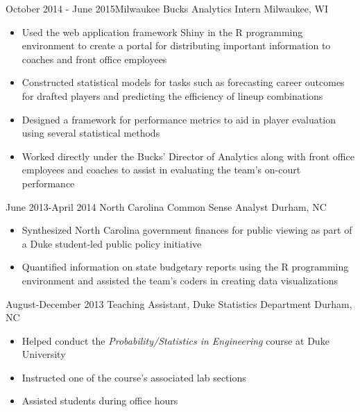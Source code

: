 \documentclass[10pt,a4paper,sans]{moderncv}        %
\begin{document}
\cventry
  {October 2014 - June 2015}{Milwaukee Bucks Analytics Intern}
  {}
  {Milwaukee, WI}
  {}
  {
    \begin{itemize}
      \item{Used the web application framework Shiny in the R programming environment to create a portal for distributing important 
      information to coaches and front office employees}
      \item{Constructed statistical models for tasks such as forecasting career outcomes for drafted players and predicting the 
      efficiency of lineup combinations}
      \item{Designed a framework for performance metrics to aid in player evaluation using several statistical methods}
      \item{Worked directly under the Bucks' Director of Analytics along with front office employees and coaches to assist in evaluating 
      the team's on-court performance}
    \end{itemize}
  }

\cventry
  {June 2013-April 2014}
  {North Carolina Common Sense Analyst}
  {}
  {Durham, NC}
  {}
  {
    \begin{itemize}
      \item{Synthesized North Carolina government finances for public viewing as part of a Duke student-led public policy initiative}
      \item{Quantified information on state budgetary reports using the R programming environment and assisted the team's coders in creating 
      data visualizations}
    \end{itemize}
  }
    
\cventry
  {August-December 2013}
  {Teaching Assistant, Duke Statistics Department}
  {}
  {Durham, NC}
  {}
  {
    \begin{itemize}
      \item{Helped conduct the \emph{Probability/Statistics in Engineering} course at Duke University}
      \item{Instructed one of the course's associated lab sections} 
      \item{Assisted students during office hours}
    \end{itemize}
  }

\clearpage
\end{document}
